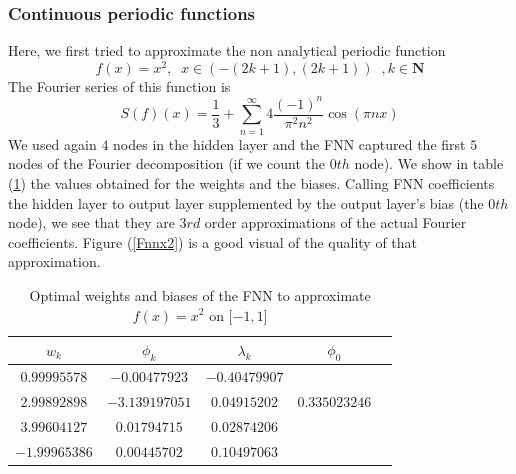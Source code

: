 \documentclass[11pt]{article}
\begin{document}
\subsubsection{Continuous periodic functions}  
Here, we first tried to approximate the non analytical periodic function
$$
f(x) = x^2, \;\; \text{$x \in \left(-(2k+1), (2k+1)\right)$}\;\;, k \in \mathbf{N}
$$
The Fourier series of this function is
$$
S(f)(x)= \frac{1}{3} + \sum_{n=1}^{\infty} 4 \frac{(-1)^n}{\pi^2 n^2} \cos(\pi nx)
$$
We used again $4$ nodes in the hidden layer and the FNN captured the first $5$ nodes of the Fourier decomposition (if we count the $0th$ node). We show in table (\ref{tabfnnx2}) the values obtained for the weights and the biases. Calling FNN coefficients the hidden layer to output layer supplemented by the output layer's bias (the $0th$ node), we see that they are $3rd$ order approximations of the actual Fourier coefficients. Figure (\ref{Fnnx2}) is a good visual of the quality of that approximation.
\begin{table}[!h]
  \begin{center}
  \begin{tabular}{ |c|c|c|c|c| } 
\hline
$w_k$ & $\phi_k$ & $\lambda_k$& $\phi_0$ \\
\hline
$0.99995578$ & $-0.00477923$ &$-0.40479907$& \\ 
$2.99892898$&$-3.139197051$ & $0.04915202$& $0.335023246$ \\ 
$3.99604127$& $0.01794715$ & $0.02874206$& \\ 
$ -1.99965386$& $0.00445702$ & $ 0.10497063$& \\ 
\hline
\end{tabular}
\caption{Optimal weights and biases of the FNN to approximate $ f(x) = x^2$ on $[-1, 1$]}\label{tabfnnx2}
\end{center}
\end{table}
\end{document}
